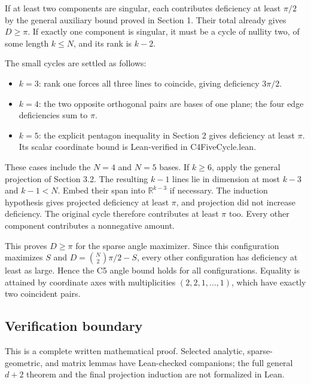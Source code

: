 \documentclass[11pt,a4paper]{article}
\providecommand{\tightlist}{\setlength{\itemsep}{0pt}\setlength{\parskip}{0pt}}
\begin{document}
If at least two components are singular, each contributes deficiency at least \(\pi/2\) by the general auxiliary bound proved in Section 1. Their total already gives \(D\ge\pi\). If exactly one component is singular, it must be a cycle of nullity two, of some length \(k\le N\), and its rank is \(k-2\).

The small cycles are settled as follows:

\begin{itemize}
\tightlist
\item
  \(k=3\): rank one forces all three lines to coincide, giving deficiency \(3\pi/2\).
\item
  \(k=4\): the two opposite orthogonal pairs are bases of one plane; the four edge deficiencies sum to \(\pi\).
\item
  \(k=5\): the explicit pentagon inequality in Section 2 gives deficiency at least \(\pi\). Its scalar coordinate bound is Lean-verified in C4FiveCycle.lean.
\end{itemize}

These cases include the \(N=4\) and \(N=5\) bases. If \(k\ge6\), apply the general projection of Section 3.2. The resulting \(k-1\) lines lie in dimension at most \(k-3\) and \(k-1<N\). Embed their span into \(\mathbb R^{k-3}\) if necessary. The induction hypothesis gives projected deficiency at least \(\pi\), and projection did not increase deficiency. The original cycle therefore contributes at least \(\pi\) too. Every other component contributes a nonnegative amount.

This proves \(D\ge\pi\) for the sparse angle maximizer. Since this configuration maximizes \(S\) and \(D=\binom N2\pi/2-S\), every other configuration has deficiency at least as large. Hence the C5 angle bound holds for all configurations. Equality is attained by coordinate axes with multiplicities \((2,2,1,\ldots,1)\), which have exactly two coincident pairs.

\subsection{Verification boundary}\label{verification-boundary}

This is a complete written mathematical proof. Selected analytic, sparse-geometric, and matrix lemmas have Lean-checked companions; the full general \(d+2\) theorem and the final projection induction are not formalized in Lean.
\end{document}
